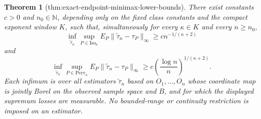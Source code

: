 \documentclass{article}
\newtheorem{theorem}{Theorem}
\begin{document}
\begin{theorem}[thm:exact-endpoint-minimax-lower-bounds]\label{thm:exact-endpoint-minimax-lower-bounds}
There exist constants \(c>0\) and \(n_0\in\mathbb N\), depending only on the fixed class constants and the compact exponent window \(K\), such that, simultaneously for every \(\kappa\in K\) and every \(n\geq n_0\),
\[
 \inf_{\widetilde\tau_n}\sup_{P\in\mathrm{Iso}_\kappa}
 E_P\|\widetilde\tau_n-\tau_P\|_\infty
 \geq c n^{-1/(\kappa+2)}
\]
and
\[
 \inf_{\widetilde\tau_n}\sup_{P\in\mathrm{Perv}_\kappa}
 E_P\|\widetilde\tau_n-\tau_P\|_\infty
 \geq c\left(\frac{\log n}{n}\right)^{1/(\kappa+2)}.
\]
Each infimum is over all estimators \(\widetilde\tau_n\) based on \(O_1,\ldots,O_n\) whose coordinate map is jointly Borel on the observed sample space and \(B\), and for which the displayed supremum losses are measurable.  No bounded-range or continuity restriction is imposed on an estimator.
\end{theorem}
\end{document}
